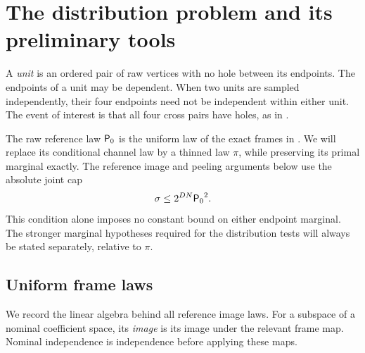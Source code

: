 \section{The distribution problem and its preliminary tools}\label{sec:distributions}

A \emph{unit} is an ordered pair of raw vertices with no hole between its endpoints.
The endpoints of a unit may be dependent.
When two units are sampled independently, their four endpoints need not be independent within either unit.
The event of interest is that all four cross pairs have holes, as in .

The raw reference law \({\mathsf P_0}\) is the uniform law of the exact frames in
.  We will replace its conditional channel law by a
thinned law \(\pi\), while preserving its primal marginal exactly.
The reference image and peeling arguments below use the absolute joint cap
\begin{equation}\label{eq:raw-law-caps}
 \sigma\le 2^{DN}{\mathsf P_0}^2.
\end{equation}
This condition alone imposes no constant bound on either endpoint marginal.
The stronger marginal hypotheses required for the distribution tests will
always be stated separately, relative to \(\pi\).

\subsection{Uniform frame laws}

We record the linear algebra behind all reference image laws.
For a subspace of a nominal coefficient space, its \emph{image} is its image under the relevant frame map.
Nominal independence is independence before applying these maps.

